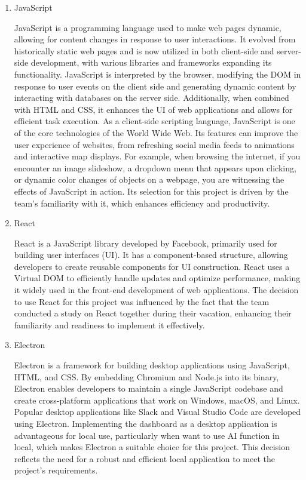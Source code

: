 \documentclass[conference]{IEEEtran}
\begin{document}
	\begin{enumerate}[itemsep=2ex, parsep=1ex]
		\item JavaScript

			JavaScript is a programming language used to make web pages dynamic, allowing
			for content changes in response to user interactions. It evolved from
			historically static web pages and is now utilized in both client-side and
			server-side development, with various libraries and frameworks expanding its
			functionality. JavaScript is interpreted by the browser, modifying the DOM
			in response to user events on the client side and generating dynamic content
			by interacting with databases on the server side. Additionally, when combined
			with HTML and CSS, it enhances the UI of web applications and allows for
			efficient task execution. As a client-side scripting language, JavaScript
			is one of the core technologies of the World Wide Web. Its features can improve
			the user experience of websites, from refreshing social media feeds to
			animations and interactive map displays. For example, when browsing the
			internet, if you encounter an image slideshow, a dropdown menu that
			appears upon clicking, or dynamic color changes of objects on a webpage,
			you are witnessing the effects of JavaScript in action. Its selection for this
			project is driven by the team's familiarity with it, which enhances
			efficiency and productivity.

		\item React

			React is a JavaScript library developed by Facebook, primarily used for building
			user interfaces (UI). It has a component-based structure, allowing developers
			to create reusable components for UI construction. React uses a Virtual
			DOM to efficiently handle updates and optimize performance, making it widely
			used in the front-end development of web applications. The decision to use
			React for this project was influenced by the fact that the team conducted
			a study on React together during their vacation, enhancing their familiarity
			and readiness to implement it effectively.

		\item Electron

			Electron is a framework for building desktop applications using JavaScript,
			HTML, and CSS. By embedding Chromium and Node.js into its binary, Electron
			enables developers to maintain a single JavaScript codebase and create
			cross-platform applications that work on Windows, macOS, and Linux. Popular
			desktop applications like Slack and Visual Studio Code are developed using
			Electron. Implementing the dashboard as a desktop application is
			advantageous for local use, particularly when want to use AI function in local,
			which makes Electron a suitable choice for this project. This decision reflects
			the need for a robust and efficient local application to meet the project’s
			requirements.


\end{enumerate}
\end{document}
